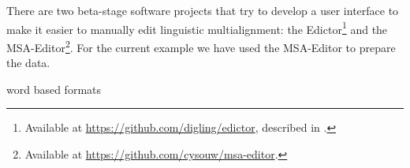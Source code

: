 \documentclass[11pt]{article}
\begin{document}
There are two beta-stage software projects that try to develop a user interface to make it easier to manually edit linguistic multialignment: the Edictor\footnote{Available at \url{https://github.com/digling/edictor}, described in \textcite{list2017}.} and the MSA-Editor\footnote{Available at \url{https://github.com/cysouw/msa-editor}.}. For the current example we have used the MSA-Editor to prepare the data.

word based formats

\printbibliography
\end{document}
